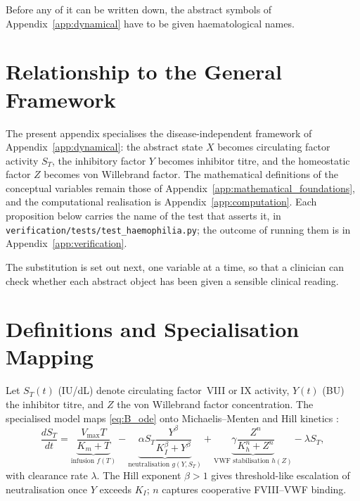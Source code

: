 Before any of it can be written down, the abstract symbols of
Appendix~\ref{app:dynamical} have to be given haematological names.

\section{Relationship to the General Framework}
\label{sec:C_relationship}
The present appendix specialises the disease-independent framework of
Appendix~\ref{app:dynamical}: the abstract state $X$ becomes circulating factor
activity $S_T$, the inhibitory factor $Y$ becomes inhibitor titre, and the
homeostatic factor $Z$ becomes von Willebrand factor. The mathematical
definitions of the conceptual variables remain those of
Appendix~\ref{app:mathematical_foundations}, and the computational realisation is
Appendix~\ref{app:computation}. Each proposition below carries the name of the
test that asserts it, in
\texttt{verification/tests/test\_haemophilia.py}; the outcome of running them is
in Appendix~\ref{app:verification}.

The substitution is set out next, one variable at a time, so that a clinician
can check whether each abstract object has been given a sensible clinical
reading.

\section{Definitions and Specialisation Mapping}
\label{sec:C_definitions}

\begin{definition}
\label{def:C_state}
Let $S_T(t)$ (IU/dL) denote circulating factor~VIII or IX activity, $Y(t)$ (BU)
the inhibitor titre, and $Z$ the von Willebrand factor concentration. The
specialised model maps \eqref{eq:B_ode} onto Michaelis--Menten and Hill kinetics
\citep{michaelis_menten_1913,hill_1910}:
\begin{equation}
\frac{dS_T}{dt}=\underbrace{\frac{V_{\max}T}{K_m+T}}_{\text{infusion }f(T)}
-\underbrace{\alpha S_T\frac{Y^\beta}{K_I^\beta+Y^\beta}}_{\text{neutralisation }g(Y,S_T)}
+\underbrace{\gamma\frac{Z^n}{K_h^n+Z^n}}_{\text{VWF stabilisation }h(Z)}
-\lambda S_T,
\label{eq:C_ode}
\end{equation}
with clearance rate $\lambda$. The Hill exponent $\beta>1$ gives threshold-like
escalation of neutralisation once $Y$ exceeds $K_I$; $n$ captures cooperative
FVIII--VWF binding.
\end{definition}

